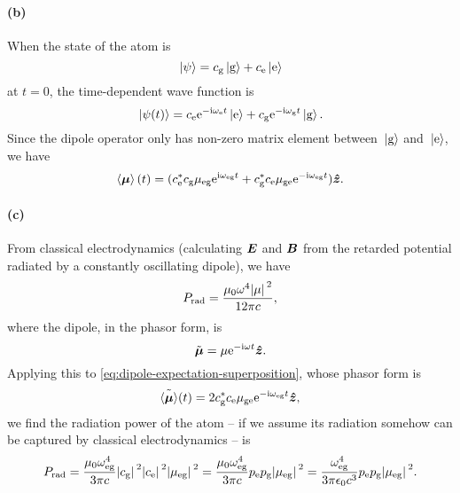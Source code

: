 \documentclass[hyperref, a4paper]{article}
\newcommand*{\ii}{\mathrm{i}}
\newcommand*{\ee}{\mathrm{e}}
\newcommand*{\omegae}{\omega_{\text{e}}}
\newcommand*{\omegag}{\omega_{\text{g}}}
\newcommand*{\omegaeg}{\omega_{\text{eg}}}
\newcommand*{\mueg}{\mu_{\text{eg}}}
\newcommand*{\muge}{\mu_{\text{ge}}}
\newcommand*{\kete}{\ket*{\text{e}}}
\newcommand*{\ketg}{\ket*{\text{g}}}
\newcommand*{\coeffe}{c_{\text{e}}}
\newcommand*{\coeffg}{c_{\text{g}}}
\newcommand*{\pope}{p_{\text{e}}}
\newcommand*{\popg}{p_{\text{g}}}
\begin{document}
\paragraph{(b)} When the state of the atom is 
\begin{equation}
    \ket*{\psi} = \coeffg \ketg + \coeffe \kete
\end{equation}
at $t = 0$, the time-dependent wave function is 
\begin{equation}
    \ket*{\psi(t)} = \coeffe \ee^{- \ii \omegae t} \kete 
    + \coeffg \ee^{- \ii \omegag t} \ketg.
\end{equation}
Since the dipole operator only has non-zero matrix element 
between $\ketg$ and $\kete$,
we have 
\begin{equation}
    \expval{\vb*{\mu}}(t) = (\coeffe^* \coeffg \mueg \ee^{\ii \omegaeg t}
    + \coeffg^* \coeffe \muge \ee^{- \ii \omegaeg t}) \vu*{z}.
    \label{eq:dipole-expectation-superposition}
\end{equation}

\paragraph{(c)} From classical electrodynamics 
(calculating $\vb*{E}$ and $\vb*{B}$ from 
the retarded potential radiated by a constantly oscillating dipole),
we have 
\begin{equation}
    P_{\text{rad}} = \frac{\mu_0 \omega^4 \abs*{\mu}^2}{12 \pi c},
\end{equation}
where the dipole, in the phasor form, is 
\begin{equation}
    \tilde{\vb*{\mu}} = \mu \ee^{- \ii \omega t} \vu*{z}.
\end{equation}
Applying this to \eqref{eq:dipole-expectation-superposition},
whose phasor form is 
\begin{equation}
    \tilde{\expval{\vb*{\mu}}}(t) =
    2 \coeffg^* \coeffe \muge \ee^{- \ii \omegaeg t}  \vu*{z},
\end{equation}
we find the radiation power of the atom -- 
if we assume its radiation somehow can be captured by classical electrodynamics --
is 
\begin{equation}
    P_{\text{rad}} = \frac{\mu_0 \omegaeg^4 }{3 \pi c} 
    \abs*{\coeffg}^2 \abs*{\coeffe}^2 \abs*{\mueg}^2
    = \frac{\mu_0 \omegaeg^4 }{3 \pi c} 
    \pope \popg \abs*{\mueg}^2
    = \frac{\omegaeg^4 }{3 \pi \epsilon_0 c^3} 
    \pope \popg \abs*{\mueg}^2 .
    \label{eq:superposition-state-classical-power-loss}
\end{equation} 
\end{document}
